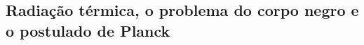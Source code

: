 \subsection{Radiação térmica, o problema do corpo negro e o postulado de Planck}
\label{ssec:black_body_problem}